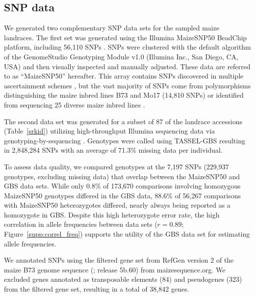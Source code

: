 \subsection*{SNP data}
We generated two complementary SNP data sets for the sampled maize landraces. 
The first set was generated using the Illumina MaizeSNP50 BeadChip platform, including 56,110 SNPs \cite[]{Ganal_2011_22174790}.  
SNPs were clustered with the default algorithm of the GenomeStudio Genotyping Module v1.0 (Illumina Inc., San Diego, CA, USA) and then visually inspected and manually adjusted.   
These data are referred to as ``MaizeSNP50'' hereafter.  
This array contains SNPs discovered in multiple ascertainment schemes \cite[]{Ganal_2011_22174790}, but the vast majority of SNPs come from polymorphisms distinguishing the maize inbred lines B73 and Mo17 (14,810 SNPs) or identified from sequencing 25 diverse maize inbred lines \cite[40,594 SNPs;][]{Gore_2009_19965431}.  

The second data set was generated for a subset of 87 of the landrace accessions (Table~\ref{srkid}) utilizing high-throughput Illumina sequencing data via genotyping-by-sequencing \cite[GBS;][]{Elshire2011}.
Genotypes were called using TASSEL-GBS \cite[]{Glaubitz_GBS} resulting in 2,848,284 SNPs with an average of 71.3\% missing data per individual.

To assess data quality, we compared genotypes at the 7,197 SNPs (229,937 genotypes, excluding missing data) that overlap between the MaizeSNP50 and GBS data sets. 
While only 0.8\% of 173,670  comparisons involving homozygous MaizeSNP50 genotypes differed in the GBS data, 88.6\% of 56,267 comparisons with MaizeSNP50 heterozygotes differed, nearly always being reported as a homozygote in GBS.
Despite this high heterozygote error rate,  the high correlation in allele frequencies between data sets ($r=0.89$; Figure~\ref{supp:correl_freq}) supports the utility of the GBS data set for estimating allele frequencies.  

We annotated SNPs using the filtered gene set from RefGen version 2 of the maize B73 genome sequence (\citealt{Schnable_2009_19965430}; release 5b.60) from maizesequence.org.  
We excluded genes annotated as transposable elements (84) and pseudogenes (323) from the filtered gene set, resulting in a total of 38,842 genes.

